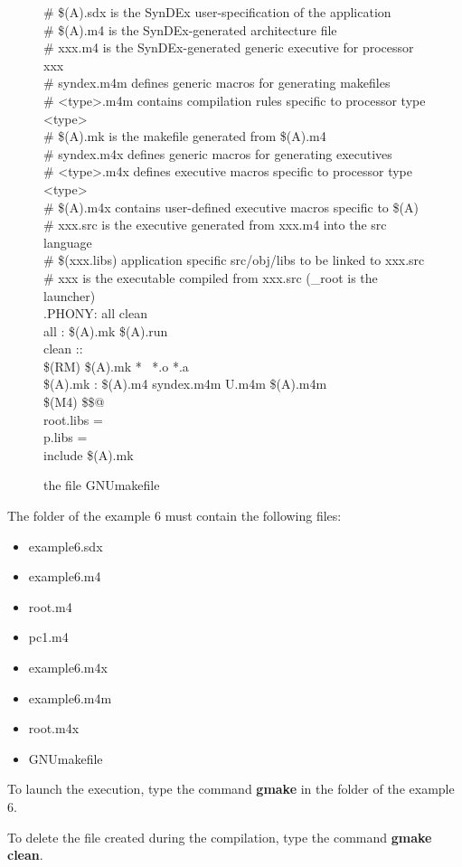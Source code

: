 \documentclass[a4paper,twoside]{report}
\begin{document}
\begin{itemize}
\begin{figure}[hbtp]
{{\# \$(A).sdx   is the SynDEx user-specification of the application\\
\# \$(A).m4    is the SynDEx-generated architecture file\\
\# xxx.m4     is the SynDEx-generated generic executive for processor xxx\\
\# syndex.m4m defines generic macros for generating makefiles\\
\# <type>.m4m contains compilation rules specific to processor type <type>\\
\# \$(A).mk    is the makefile generated from \$(A).m4\\
\# syndex.m4x defines generic macros for generating executives\\
\# <type>.m4x defines executive macros specific to processor type <type>\\
\# \$(A).m4x   contains user-defined executive macros specific to \$(A)\\
\# xxx.src    is the executive generated from xxx.m4 into the src language\\
\# \$(xxx.libs) application specific src/obj/libs to be linked to xxx.src\\
\# xxx       is the executable compiled from xxx.src (\_root is the launcher)\\

.PHONY: all clean\\
all : \$(A).mk \$(A).run\\
clean ::\\
        \$(RM) \$(A).mk *~ *.o *.a\\

\$(A).mk : \$(A).m4 syndex.m4m U.m4m \$(A).m4m\\
        \$(M4) \$< >\$@\\

root.libs = \\
p.libs = \\

include \$(A).mk\\
}}
        \caption{\rm{the file GNUmakefile}}
        \label{GNUmakefile}
\end{figure}

\end{itemize}

\newpage
The folder of the example 6 must contain the following files:
\begin{itemize}
\item example6.sdx
\item example6.m4
\item root.m4
\item pc1.m4
\item example6.m4x
\item example6.m4m
\item root.m4x
\item GNUmakefile
\end{itemize}

To launch the execution, type the command \textbf{gmake} in the folder of the
example 6. 

To delete the file created during the compilation, type the command
\textbf{gmake clean}.
\end{document}
